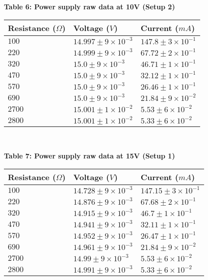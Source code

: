 \begin{center}
    {\textbf{Table 6: Power supply raw data at 10V (Setup 2)} }
\end{center}
\vspace{10pt}
\newpage

\begin{tabular}{| p{} | p{} | p{} |}
    \hline
    Resistance ($\Omega$) & Voltage ($V$) & Current ($mA$)\\
    \hline 
    $100$ & $14.997 \pm 9\times10^{-3}$ & $147.8 \pm 3\times10^{-1}$\\
    $220$ & $14.999 \pm 9\times10^{-3}$ & $67.72 \pm 2\times10^{-1}$\\
    $320$ & $15.0 \pm 9\times10^{-3}$ & $46.71 \pm 1\times10^{-1}$\\
    $470$ & $15.0 \pm 9\times10^{-3}$ & $32.12 \pm 1\times10^{-1}$\\
    $570$ & $15.0 \pm 9\times10^{-3}$ & $26.46 \pm 1\times10^{-1}$\\
    $690$ & $15.0 \pm 9\times10^{-3}$ & $21.84 \pm 9\times10^{-2}$\\
    $2700$ & $15.001 \pm 1\times10^{-2}$ & $5.53 \pm 6\times10^{-2}$\\
    $2800$ & $15.001 \pm 1\times10^{-2}$ & $5.33 \pm 6\times10^{-2}$\\
    \hline 
 \end{tabular}\\

\begin{center}
    {\textbf{Table 7: Power supply raw data at 15V (Setup 1)} }
\end{center}
\vspace{10pt}
\begin{tabular}{| p{} | p{} | p{} |}
    \hline
    Resistance ($\Omega$) & Voltage ($V$) & Current ($mA$)\\
    \hline 
    $100$ & $14.728 \pm 9\times10^{-3}$ & $147.15 \pm 3\times10^{-1}$\\
    $220$ & $14.876 \pm 9\times10^{-3}$ & $67.68 \pm 2\times10^{-1}$\\
    $320$ & $14.915 \pm 9\times10^{-3}$ & $46.7 \pm 1\times10^{-1}$\\
    $470$ & $14.941 \pm 9\times10^{-3}$ & $32.11 \pm 1\times10^{-1}$\\
    $570$ & $14.952 \pm 9\times10^{-3}$ & $26.47 \pm 1\times10^{-1}$\\
    $690$ & $14.961 \pm 9\times10^{-3}$ & $21.84 \pm 9\times10^{-2}$\\
    $2700$ & $14.99 \pm 9\times10^{-3}$ & $5.53 \pm 6\times10^{-2}$\\
    $2800$ & $14.991 \pm 9\times10^{-3}$ & $5.33 \pm 6\times10^{-2}$\\
    \hline 
 \end{tabular}\\


